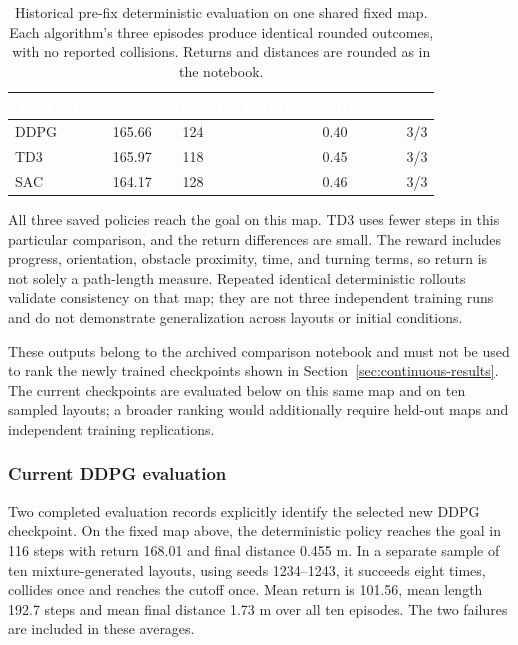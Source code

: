 \documentclass[11pt,a4paper]{article}
\theoremstyle{definition}
\theoremstyle{plain}
\theoremstyle{remark}
\newcommand{\thcell}[1]{\textcolor{white}{\textbf{#1}}}
\begin{document}
\begin{table}[h!]
\centering\small
\begin{tabularx}{\linewidth}{@{}Yrrrr@{}}
\toprule
{}\thcell{Algorithm}&\thcell{Return}&\thcell{Steps}&\thcell{Final distance (m)}&\thcell{Successes}\\
\midrule
DDPG&165.66&124&0.40&3/3\\
 TD3&165.97&118&0.45&3/3\\
SAC&164.17&128&0.46&3/3\\
\bottomrule
\end{tabularx}
\caption{Historical pre-fix deterministic evaluation on one shared fixed map. Each algorithm's three episodes produce identical rounded outcomes, with no reported collisions. Returns and distances are rounded as in the notebook.}
\label{tab:fixed-benchmark}
\end{table}

All three saved policies reach the goal on this map. TD3 uses fewer steps in this particular comparison, and the return differences are small. The reward includes progress, orientation, obstacle proximity, time, and turning terms, so return is not solely a path-length measure. Repeated identical deterministic rollouts validate consistency on that map; they are not three independent training runs and do not demonstrate generalization across layouts or initial conditions.

These outputs belong to the archived comparison notebook and must not be used to rank the newly trained checkpoints shown in Section~\ref{sec:continuous-results}. The current checkpoints are evaluated below on this same map and on ten sampled layouts; a broader ranking would additionally require held-out maps and independent training replications.

\subsubsection{Current DDPG evaluation}

Two completed evaluation records explicitly identify the selected new DDPG checkpoint. On the fixed map above, the deterministic policy reaches the goal in 116 steps with return 168.01 and final distance 0.455 m. In a separate sample of ten mixture-generated layouts, using seeds 1234--1243, it succeeds eight times, collides once and reaches the cutoff once. Mean return is 101.56, mean length 192.7 steps and mean final distance 1.73 m over all ten episodes. The two failures are included in these averages.
\end{document}
